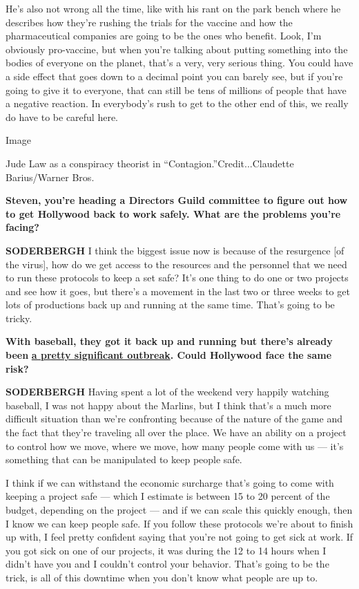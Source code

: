 He's also not wrong all the time, like with his rant on the park bench
where he describes how they're rushing the trials for the vaccine and
how the pharmaceutical companies are going to be the ones who benefit.
Look, I'm obviously pro-vaccine, but when you're talking about putting
something into the bodies of everyone on the planet, that's a very, very
serious thing. You could have a side effect that goes down to a decimal
point you can barely see, but if you're going to give it to everyone,
that can still be tens of millions of people that have a negative
reaction. In everybody's rush to get to the other end of this, we really
do have to be careful here.

Image

Jude Law as a conspiracy theorist in ``Contagion.''Credit...Claudette
Barius/Warner Bros.

\textbf{Steven, you're heading a Directors Guild committee to figure out
how to get Hollywood back to work safely. What are the problems you're
facing?}

\textbf{SODERBERGH} I think the biggest issue now is because of the
resurgence {[}of the virus{]}, how do we get access to the resources and
the personnel that we need to run these protocols to keep a set safe?
It's one thing to do one or two projects and see how it goes, but
there's a movement in the last two or three weeks to get lots of
productions back up and running at the same time. That's going to be
tricky.

\textbf{With baseball, they got it back up and running but there's
already been}
\textbf{\href{https://www.nytimes3xbfgragh.onion/2020/07/27/sports/baseball/marlins-game-canceled.html}{a
pretty significant outbreak}. Could Hollywood face the same risk?}

\textbf{SODERBERGH} Having spent a lot of the weekend very happily
watching baseball, I was not happy about the Marlins, but I think that's
a much more difficult situation than we're confronting because of the
nature of the game and the fact that they're traveling all over the
place. We have an ability on a project to control how we move, where we
move, how many people come with us --- it's something that can be
manipulated to keep people safe.

I think if we can withstand the economic surcharge that's going to come
with keeping a project safe --- which I estimate is between 15 to 20
percent of the budget, depending on the project --- and if we can scale
this quickly enough, then I know we can keep people safe. If you follow
these protocols we're about to finish up with, I feel pretty confident
saying that you're not going to get sick at work. If you got sick on one
of our projects, it was during the 12 to 14 hours when I didn't have you
and I couldn't control your behavior. That's going to be the trick, is
all of this downtime when you don't know what people are up to.

